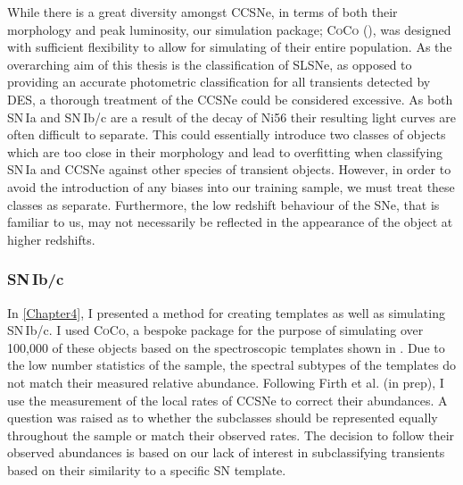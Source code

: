 While there is a great diversity amongst CCSNe, in terms of both their morphology and peak luminosity, our simulation package; \textsc{CoCo} (), was designed with sufficient flexibility to allow for simulating of their entire population. As the overarching aim of this thesis is the classification of SLSNe, as opposed to providing an accurate photometric classification for all transients detected by DES, a thorough treatment of the CCSNe could be considered excessive. As both SN\,Ia and SN\,Ib/c are a result of the decay of Ni56 their resulting light curves are often difficult to separate. This could essentially introduce two classes of objects which are too close in their morphology and lead to overfitting when classifying SN\,Ia and CCSNe against other species of transient objects. However, in order to avoid the introduction of any biases into our training sample, we must treat these classes as separate. Furthermore, the low redshift behaviour of the SNe, that is familiar to us, may not necessarily be reflected in the appearance of the object at higher redshifts.

\subsubsection{SN\,Ib/c}
In \cref{Chapter4}, I presented a method for creating templates as well as simulating SN\,Ib/c. I used \textsc{CoCo}, a bespoke package for the purpose of simulating over 100,000 of these objects based on the spectroscopic templates shown in . Due to the low number statistics of the sample, the spectral subtypes of the templates do not match their measured relative abundance. Following Firth et al. (in prep), I use the \citet{Li2011} measurement of the local rates of CCSNe to correct their abundances. A question was raised as to whether the subclasses should be represented equally throughout the sample or match their observed rates. The decision to follow their observed abundances is based on our lack of interest in subclassifying transients based on their similarity to a specific SN template.

